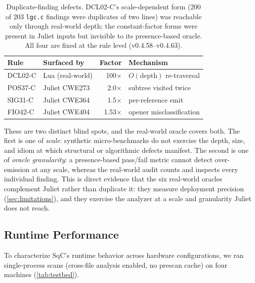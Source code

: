 \begin{table}[t]
\centering
\footnotesize
\setlength{\tabcolsep}{4pt}
\begin{tabular}{@{}llrl@{}}
\toprule
\textbf{Rule} & \textbf{Surfaced by} & \textbf{Factor} & \textbf{Mechanism} \\
\midrule
DCL02-C & Lua (real-world)  & 100$\times$  & $O(\text{depth})$ re-traversal \\
POS37-C & Juliet CWE273     & 2.0$\times$  & subtree visited twice \\
SIG31-C & Juliet CWE364     & 1.5$\times$  & per-reference emit \\
FIO42-C & Juliet CWE404     & 1.53$\times$ & opener misclassification \\
\bottomrule
\end{tabular}
\caption{Duplicate-finding defects.  DCL02-C's scale-dependent form
(200 of 203 \texttt{lgc.c} findings were duplicates of two lines) was
reachable only through real-world depth; the constant-factor forms were
present in Juliet inputs but invisible to its presence-based oracle.
All four are fixed at the rule level (v0.4.58--v0.4.63).}
\label{tab:dup-class}
\end{table}

These are two distinct blind spots, and the real-world oracle covers
both.  The first is one of \emph{scale}: synthetic micro-benchmarks do
not exercise the depth, size, and idiom at which structural or
algorithmic defects manifest.  The second is one of \emph{oracle
granularity}: a presence-based pass/fail metric cannot detect
over-emission at any scale, whereas the real-world audit counts and
inspects every individual finding.  This is direct evidence that the
six real-world oracles complement Juliet rather than duplicate it:
they measure deployment precision (\cref{sec:limitations}), and they
exercise the analyzer at a scale and granularity Juliet does not reach.

\subsection{Runtime Performance}
\label{sec:runtime}

To characterize SqC's runtime behavior across hardware configurations,
we ran single-process scans (cross-file analysis enabled, no prescan
cache) on four machines (\cref{tab:testbed}).

